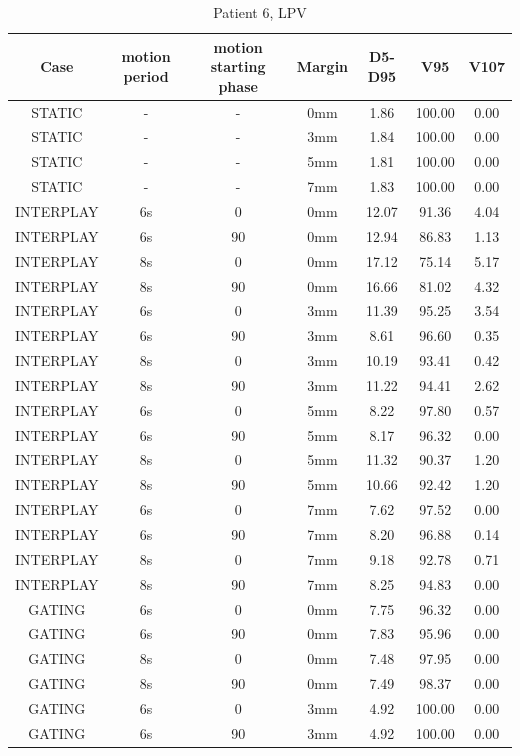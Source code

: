 \documentclass[type=dr, dr=rernat, accentcolor=tud7b,colorbacktitle, bigchapter, openright, twoside, 12pt ]{tudthesis}
\begin{document}
\begin{table}[H]
  \centering
  \caption{Patient 6, LPV}
  \begin{tabular}{|c||c|c|c||c|c|c|}
    \hline\hline
    Case & motion period & motion starting phase & Margin & D5-D95 & V95 & V107\\
    \hline 
STATIC & - & - & 0mm & 1.86 & 100.00 & 0.00 \\
STATIC & - & - & 3mm & 1.84 & 100.00 & 0.00 \\
STATIC & - & - & 5mm & 1.81 & 100.00 & 0.00 \\
STATIC & - & - & 7mm & 1.83 & 100.00 & 0.00 \\
INTERPLAY & 6s & 0 & 0mm & 12.07 & 91.36 & 4.04 \\
INTERPLAY & 6s & 90 & 0mm & 12.94 & 86.83 & 1.13 \\
INTERPLAY & 8s & 0 & 0mm & 17.12 & 75.14 & 5.17 \\
INTERPLAY & 8s & 90 & 0mm & 16.66 & 81.02 & 4.32 \\
INTERPLAY & 6s & 0 & 3mm & 11.39 & 95.25 & 3.54 \\
INTERPLAY & 6s & 90 & 3mm & 8.61 & 96.60 & 0.35 \\
INTERPLAY & 8s & 0 & 3mm & 10.19 & 93.41 & 0.42 \\
INTERPLAY & 8s & 90 & 3mm & 11.22 & 94.41 & 2.62 \\
INTERPLAY & 6s & 0 & 5mm & 8.22 & 97.80 & 0.57 \\
INTERPLAY & 6s & 90 & 5mm & 8.17 & 96.32 & 0.00 \\
INTERPLAY & 8s & 0 & 5mm & 11.32 & 90.37 & 1.20 \\
INTERPLAY & 8s & 90 & 5mm & 10.66 & 92.42 & 1.20 \\
INTERPLAY & 6s & 0 & 7mm & 7.62 & 97.52 & 0.00 \\
INTERPLAY & 6s & 90 & 7mm & 8.20 & 96.88 & 0.14 \\
INTERPLAY & 8s & 0 & 7mm & 9.18 & 92.78 & 0.71 \\
INTERPLAY & 8s & 90 & 7mm & 8.25 & 94.83 & 0.00 \\
GATING & 6s & 0 & 0mm & 7.75 & 96.32 & 0.00 \\
GATING & 6s & 90 & 0mm & 7.83 & 95.96 & 0.00 \\
GATING & 8s & 0 & 0mm & 7.48 & 97.95 & 0.00 \\
GATING & 8s & 90 & 0mm & 7.49 & 98.37 & 0.00 \\
GATING & 6s & 0 & 3mm & 4.92 & 100.00 & 0.00 \\
GATING & 6s & 90 & 3mm & 4.92 & 100.00 & 0.00 \\

\end{tabular}
\end{table}
\end{document}
